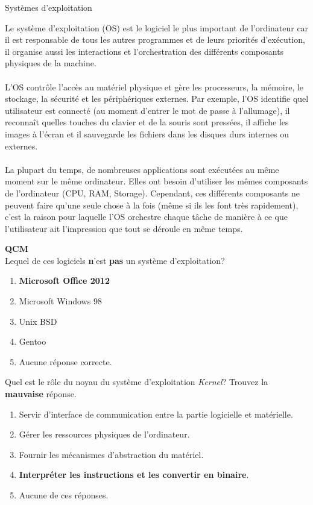 \begin{section}{Systèmes d'exploitation}
    
Le système d'exploitation (OS) est le logiciel le plus important de l'ordinateur car il est responsable de tous les autres programmes et de leurs priorités d'exécution, il organise aussi les interactions et l'orchestration des différents composants physiques de la machine.
\\\\
L'OS contrôle l'accès au matériel physique et gère les processeurs, la mémoire, le stockage, la sécurité et les périphériques externes. Par exemple, l'OS identifie quel utilisateur est connecté (au moment d'entrer le mot de passe à l'allumage), il reconnaît quelles touches du clavier et de la souris sont pressées, il affiche les images à l'écran et il sauvegarde les fichiers dans les disques durs internes ou externes.
\\\\
La plupart du temps, de nombreuses applications sont exécutées au même moment sur le même ordinateur. Elles ont besoin d'utiliser les mêmes composants de l'ordinateur (CPU, RAM, Storage). Cependant, ces différents composants ne peuvent faire qu'une seule chose à la fois (même si ils les font très rapidement), c'est la raison pour laquelle l'OS orchestre chaque tâche de manière à ce que l'utilisateur ait l'impression que tout se déroule en même temps.
\\

    \begin{Exercice}[5 minutes]  \textbf{QCM}\\
    Lequel de ces logiciels \textbf{n}'est \textbf{pas} un système d'exploitation?
        \begin{enumerate}
            \item \textbf{Microsoft Office 2012}
            \item Microsoft Windows 98
            \item Unix BSD
            \item Gentoo
            \item Aucune réponse correcte.
        \end{enumerate}
    \end{Exercice}

    \begin{Exercice}[5 minutes]
        Quel est le rôle du noyau du système d'exploitation \textit{Kernel}? Trouvez la \textbf{mauvaise} réponse.
        \begin{enumerate}
            \item Servir d'interface de communication entre la partie logicielle et matérielle.
            \item Gérer les ressources physiques de l'ordinateur.
            \item Fournir les mécanismes d'abstraction du matériel.
            \item \textbf{Interpréter les instructions et les convertir en binaire}.
            \item Aucune de ces réponses.
        \end{enumerate}
    \end{Exercice}
    

\end{section}
